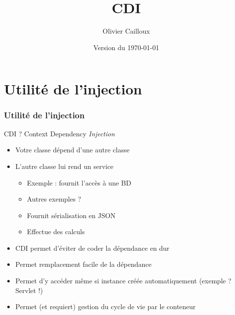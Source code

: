 \documentclass[english, french]{beamer}
\title{CDI}
\subtitle{}
\author{Olivier Cailloux}
\institute[LAMSADE]{LAMSADE, Université Paris-Dauphine}
\date{Version du \today}
\begin{document}


\begin{frame}[plain]
   \titlepage
\end{frame}
\addtocounter{framenumber}{-1}

\section{Utilité de l’injection}
\begin{frame}
	\frametitle{Utilité de l’injection}
	CDI ? \pause Context Dependency \emph{Injection}\pause
	\begin{itemize}
		\item Votre classe dépend d’une autre classe
		\item L’autre classe lui rend un service
		\begin{itemize}
			\item Exemple : fournit l’accès à une BD
			\item Autres exemples ? \pause
			\item Fournit sérialisation en JSON
			\item Effectue des calculs
		\end{itemize}
		\item CDI permet d’éviter de coder la dépendance en dur
		\item Permet remplacement facile de la dépendance
		\item Permet d’y accéder même si instance créée automatiquement (exemple ? \pause Servlet !)
		\item Permet (et requiert) gestion du cycle de vie par le conteneur
	\end{itemize}
\end{frame}
\end{document}
